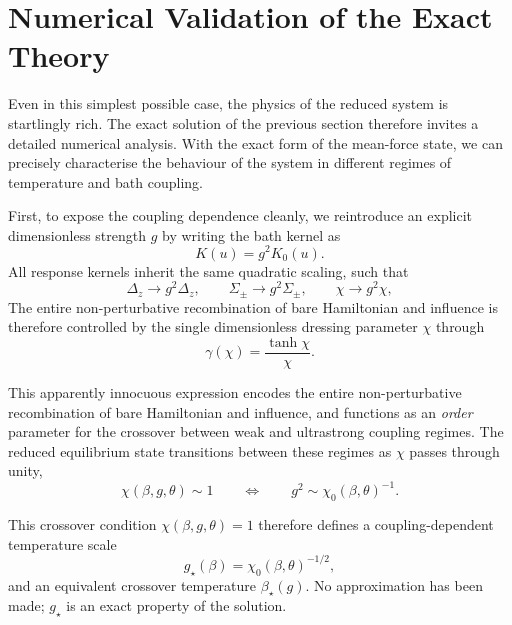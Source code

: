 ﻿%
\section{Numerical Validation of the Exact Theory}
\label{sec:numerical_v6}

Even in this simplest possible case, the physics of the reduced system is startlingly rich. The exact solution of the previous section therefore invites a detailed numerical analysis. With the exact form of the mean-force state, we can precisely characterise the behaviour of the system in different regimes of temperature and bath coupling. 

First, to expose the coupling dependence cleanly, we reintroduce an explicit dimensionless strength $g$ by writing the bath kernel as
\begin{equation}
    K(u)=g^2 K_0(u).
\end{equation}
All response kernels inherit the same quadratic scaling, such that
\begin{equation}
    \Delta_z \to g^2 \Delta_{z},
    \qquad
    \Sigma_\pm \to g^2 \Sigma_{\pm},
    \qquad
    \chi \to g^2 \chi,
\end{equation}
The entire non-perturbative recombination of bare Hamiltonian and influence is therefore controlled by the single dimensionless dressing parameter $\chi$ through
\begin{equation}
    \gamma(\chi)=\frac{\tanh\chi}{\chi}.
    \label{eq:gamma_chi_validation}
\end{equation}

This apparently innocuous expression encodes the entire non-perturbative recombination of bare Hamiltonian and influence, and functions as an \emph{order} parameter for the crossover between weak and ultrastrong coupling regimes. The reduced equilibrium state transitions between these regimes as $\chi$ passes through unity,
\begin{equation}
    \chi(\beta,g,\theta)\sim 1
    \qquad \Longleftrightarrow \qquad
    g^2 \sim \chi_0(\beta,\theta)^{-1}.
    \label{eq:chi_crossover_condition_v5}
\end{equation}


This crossover condition $\chi(\beta,g,\theta)=1$ therefore
defines a coupling-dependent temperature scale
\begin{equation}
  g_\star(\beta) = \chi_0(\beta,\theta)^{-1/2},
  \label{eq:gstar_def_v6}
\end{equation}
and an equivalent crossover temperature $\beta_\star(g)$.  No approximation has
been made; $g_\star$ is an exact property of the solution.

